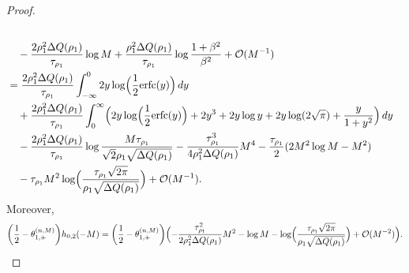 \documentclass[a4paper]{article}
\numberwithin{equation}{section}
\begin{document}
\begin{proof}
\begin{align*}
\\
&\quad
-\frac{2\rho_1^2\Delta Q(\rho_1)}{\tau_{\rho_1}}\log M
+\frac{\rho_1^2\Delta Q(\rho_1)}{\tau_{\rho_1}}\log \frac{1+\beta^2}{\beta^2}
+\mathcal{O}(M^{-1})
\\
&=
\frac{2\rho_1^2\Delta Q(\rho_1)}{\tau_{\rho_1}}
\int_{-\infty}^0 2y\log\Bigl(\frac{1}{2}\mathrm{erfc}(y)\Bigr)\, dy
\\
&\quad
+\frac{2\rho_1^2\Delta Q(\rho_1)}{\tau_{\rho_1}}
\int_0^{\infty}
\Bigl(
2y\log\Bigl(\frac{1}{2}\mathrm{erfc}(y)\Bigr)+2y^3+2y\log y+2y\log(2\sqrt{\pi})+\frac{y}{1+y^2}
\Bigr)\,dy
\\
&\quad
-\frac{2\rho_1^2\Delta Q(\rho_1)}{\tau_{\rho_1}}
\log\frac{M\tau_{\rho_1}}{\sqrt{2}\rho_1\sqrt{\Delta Q(\rho_1)}}
-\frac{\tau_{\rho_1}^3}{4\rho_1^2\Delta Q(\rho_1)}M^4
-\frac{\tau_{\rho_1}}{2}(2M^2\log M-M^2)
\\
&\quad 
-\tau_{\rho_1}M^2\log\Bigl(\frac{\tau_{\rho_1}\sqrt{2\pi}}{\rho_1\sqrt{\Delta Q(\rho_1)}}\Bigr)
+\mathcal{O}(M^{-1}).
\end{align*}
Moreover,
\[
\bigg( \frac{1}{2}-\theta_{1,+}^{(n,M)} \bigg)h_{0,2}(-M)
=
\bigg( \frac{1}{2}-\theta_{1,+}^{(n,M)} \bigg)
\Bigl( 
-\frac{\tau_{\rho_1}^2}{2\rho_1^2\Delta Q(\rho_1)}M^2-\log M-\log\Bigl(\frac{\tau_{\rho_1}\sqrt{2\pi}}{\rho_1\sqrt{\Delta Q(\rho_1)}}\Bigr)
+
\mathcal{O}(M^{-2})
\Bigr).
\]


\end{proof}
\end{document}
